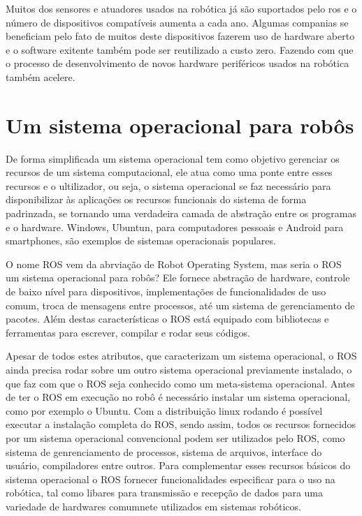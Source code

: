 Muitos dos sensores e atuadores usados na robótica já são suportados pelo ros e o número de dispositivos compatíveis aumenta a cada ano. Algumas companias se beneficiam pelo fato de muitos deste dispositivos fazerem uso de hardware aberto e o software exitente também pode ser reutilizado a custo zero. Fazendo com que o processo de desenvolvimento de novos hardware periféricos usados na robótica também acelere.




\section{Um sistema operacional para robôs}

De forma simplificada um sistema operacional tem como objetivo gerenciar os recursos de um sistema computacional, ele atua como uma ponte entre esses recursos e o ultilizador, ou seja, o sistema operacional se faz necessário para disponibilizar às aplicações os recursos 
funcionais do sistema de forma padrinzada, se tornando uma verdadeira camada de abstração entre os programas e o hardware. Windows, Ubuntun, para computadores pessoais e Android para smartphones, são exemplos de sistemas operacionais populares.

O nome ROS vem da abrviação de Robot Operating System, mas seria o ROS um sistema operacional para robôs? Ele fornece abstração de hardware, controle de baixo nível para dispositivos, implementações de funcionalidades de uso comum, troca de mensagens entre processos, até um sistema de gerenciamento de pacotes. Além destas características o ROS está equipado com bibliotecas e ferramentas para escrever, compilar e rodar seus códigos. %

Apesar de todos estes atributos, que caracterizam um sistema operacional, o ROS ainda precisa rodar sobre um outro sistema operacional previamente instalado, o que faz com que o ROS seja conhecido como um meta-sistema operacional. Antes de ter o ROS em execução no robô é necessário instalar um sistema operacional, como por exemplo o Ubuntu. Com a distribuição linux rodando é possível executar a instalação completa do ROS, sendo assim, todos os recursos fornecidos por um sistema operacional convencional podem ser utilizados pelo ROS, como sistema de genrenciamento de processos, sistema de arquivos, interface do usuário, compiladores entre outros. Para complementar esses recursos básicos do sistema operacional o ROS fornecer funcionalidades especificar para o uso na robótica, tal como libares para transmissão e recepção de dados para uma variedade de hardwares comumnete utilizados em sistemas robóticos. 

